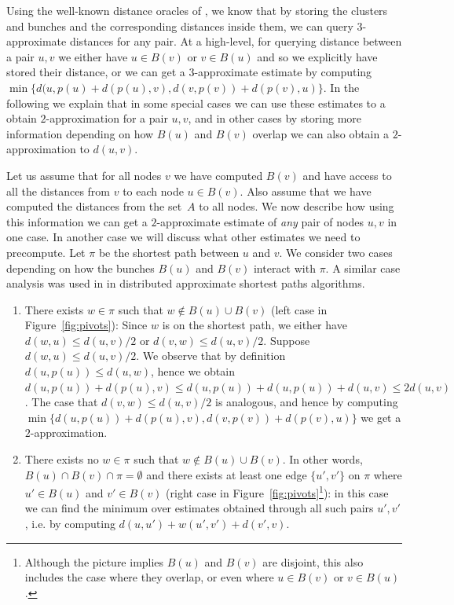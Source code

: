 Using the well-known distance oracles of \cite{TZ2005}, we know that by storing the clusters and bunches and the corresponding distances inside them, we can query $3$-approximate distances for any pair. At a high-level, for querying distance between a pair $u, v$ we either have $u \in B(v)$ or $v \in B(u)$ and so we explicitly have stored their distance, or we can get a $3$-approximate estimate by computing $\min \{d(u,p(u)+d(p(u),v), d(v, p(v))+d(p(v), u)\}$. In the following we explain that in some special cases we can use these estimates to a obtain $2$-approximation for a pair $u,v$, and in other cases by storing more information depending on how $B(u)$ and $B(v)$ overlap we can also obtain a $2$-approximation to $d(u,v)$. 

Let us assume that for all nodes $v$ we have computed $B(v)$ and have access to all the distances from $v$ to each node $u \in B(v)$. Also assume that we have computed the distances from the set~$A$ to all nodes.
We now describe how using this information we can get a $2$-approximate estimate of \textit{any} pair of nodes $u,v$ in one case. In another case we will discuss what other estimates we need to precompute. Let $\pi$ be the shortest path between $u$ and $v$.
 We consider two cases depending on how the bunches $B(u)$ and $B(v)$ interact with $\pi$. A similar case analysis was used in \cite{censor2021fast, dory2022exponentially} in distributed approximate shortest paths algorithms. 
\begin{enumerate}
    \setlength\itemsep{0em}
    \item \label{overview:outside_bunch} There exists $w \in \pi$ such that $w \not \in B(u) \cup B(v)$ (left case in Figure~\ref{fig:pivots}): Since $w$ is on the shortest path, we either have $d(w,u) \leq d(u,v)/2$ or $d (v,w) \leq d(u,v)/2$. Suppose $d(w,u) \leq d(u,v)/2$. We observe that by definition $d(u,p(u))\leq d(u,w)$, hence we obtain $d(u,p(u))+d(p(u),v)\leq d(u,p(u))+d(u,p(u))+d(u,v) \leq 2d(u,v)$. The case that $d (v,w) \leq d(u,v)/2$ is analogous, and hence by computing $\min \{ d(u,p(u))+d(p(u),v), d(v,p(v))+d(p(v),u)\}$ we get a $2$-approximation.
 
    \item \label{overview:adj_bunches} There exists no $w \in \pi$ such that $w \not \in B(u) \cup B(v)$. In other words, $B(u) \cap B(v) \cap \pi = \emptyset$ and there exists at least one edge $\{u',v'\}$ on $\pi$ where $u' \in B(u)$ and $v' \in B(v)$ (right case in Figure~\ref{fig:pivots}\footnote{Although the picture implies $B(u)$ and $B(v)$ are disjoint, this also includes the case where they overlap, or even where $u\in B(v)$ or $v\in B(u)$.}): in this case we can find the minimum over estimates obtained through all such pairs $u', v'$, i.e. by computing $d(u,u')+ w(u',v')+d(v',v)$. 
\end{enumerate}

